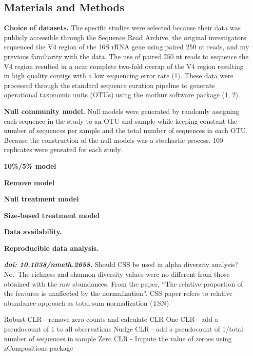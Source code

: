 \documentclass[
]{article}
\begin{document}
\hypertarget{materials-and-methods}{%
\subsection{Materials and Methods}\label{materials-and-methods}}

\textbf{Choice of datasets.} The specific studies were selected because
their data was publicly accessible through the Sequence Read Archive,
the original investigators sequenced the V4 region of the 16S rRNA gene
using paired 250 nt reads, and my previous familiarity with the data.
The use of paired 250 nt reads to sequence the V4 region resulted in a
near complete two-fold overap of the V4 region resulting in high quality
contigs with a low sequencing error rate (1). These data were processed
through the standard sequence curation pipeline to generate operational
taxonomic units (OTUs) using the mothur software package (1, 2).

\textbf{Null community model.} Null models were generated by randomly
assigning each sequence in the study to an OTU and sample while keeping
constant the number of sequences per sample and the total number of
sequences in each OTU. Because the construction of the null models was a
stochastic process, 100 replicates were geneated for each study.

\textbf{10\%/5\% model}

\textbf{Remove model}

\textbf{Null treatment model}

\textbf{Size-based treatment model}

\textbf{Data availability.}

\textbf{Reproducible data analysis.}

\textbf{\emph{doi: 10.1038/nmeth.2658.}} Should CSS be used in alpha
diversity analysis? No.~The richness and shannon diversity values were
no different from those obtained with the raw abundances. From the
paper, ``The relative proportion of the features is unaffected by the
normalization''. CSS paper refers to relative abundance approach as
total-sum normalization (TSN)

Robust CLR - remove zero counts and calculate CLR One CLR - add a
pseudocount of 1 to all observations Nudge CLR - add a pseudocount of
1/total number of sequences in sample Zero CLR - Impute the value of
zeroes using zCompositions package
\end{document}
